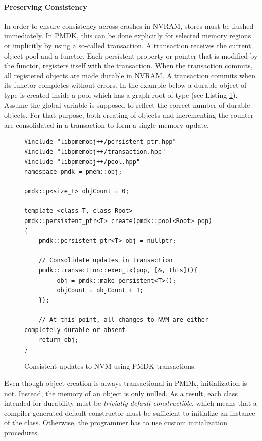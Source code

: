 \paragraph{Preserving Consistency}

In order to ensure consistency across crashes in NVRAM, stores must be flushed
immediately. In PMDK, this can be done explicitly for selected memory regions or
implicitly by using a so-called transaction. A transaction receives the current
object pool and a functor. Each persistent property or pointer that is modified
by the functor, registers itself with the transaction. When the transaction
commits, all registered objects are made durable in NVRAM. A transaction commits
when its functor completes without errors. In the example below a durable object
of type  is created inside a pool which has a graph root of type
 (see Listing \ref{lst:pmdk-tx}). Assume the global variable
 is supposed to reflect the correct number of durable objects.
For that purpose, both creating of objects and incrementing the counter are
consolidated in a transaction to form a single memory update.

\begin{figure}[h!]
\begin{lstlisting}
#include "libpmemobj++/persistent_ptr.hpp"
#include "libpmemobj++/transaction.hpp"
#include "libpmemobj++/pool.hpp"
namespace pmdk = pmem::obj;

pmdk::p<size_t> objCount = 0;

template <class T, class Root>
pmdk::persistent_ptr<T> create(pmdk::pool<Root> pop)
{
    pmdk::persistent_ptr<T> obj = nullptr;

    // Consolidate updates in transaction
    pmdk::transaction::exec_tx(pop, [&, this](){
         obj = pmdk::make_persistent<T>();
         objCount = objCount + 1;
    });

    // At this point, all changes to NVM are either completely durable or absent
    return obj;
}
\end{lstlisting}
\caption{Consistent updates to NVM using PMDK transactions.}
\label{lst:pmdk-tx}
\end{figure}

Even though object creation is always transactional in PMDK, initialization is
not. Instead, the memory of an object is only nulled. As a result, each class
intended for durability must be \emph{trivially default constructible}, which
means that a compiler-generated default constructor must be sufficient to
initialize an instance of the class. Otherwise, the programmer has to use custom
initialization procedures.

